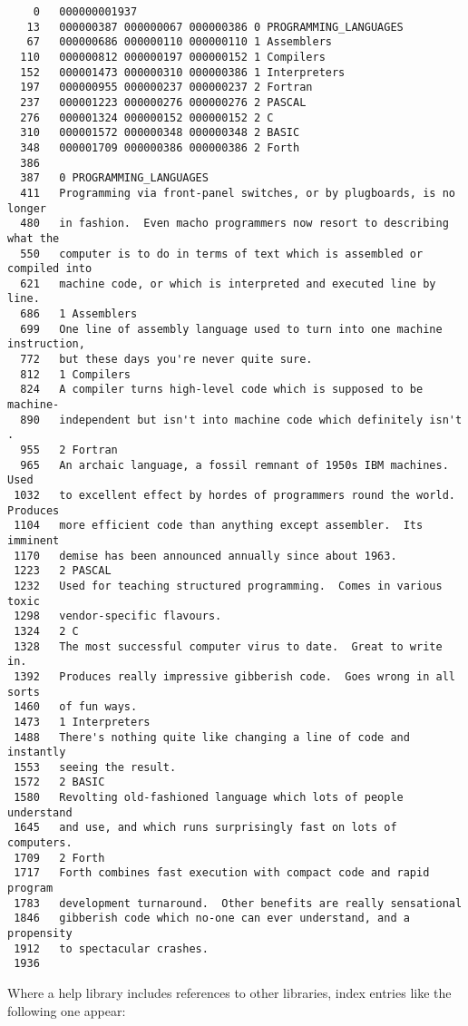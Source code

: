 \begin{small}
\begin{verbatim}
    0   000000001937
   13   000000387 000000067 000000386 0 PROGRAMMING_LANGUAGES
   67   000000686 000000110 000000110 1 Assemblers
  110   000000812 000000197 000000152 1 Compilers
  152   000001473 000000310 000000386 1 Interpreters
  197   000000955 000000237 000000237 2 Fortran
  237   000001223 000000276 000000276 2 PASCAL
  276   000001324 000000152 000000152 2 C
  310   000001572 000000348 000000348 2 BASIC
  348   000001709 000000386 000000386 2 Forth
  386   
  387   0 PROGRAMMING_LANGUAGES
  411   Programming via front-panel switches, or by plugboards, is no longer
  480   in fashion.  Even macho programmers now resort to describing what the
  550   computer is to do in terms of text which is assembled or compiled into
  621   machine code, or which is interpreted and executed line by line.
  686   1 Assemblers
  699   One line of assembly language used to turn into one machine instruction,
  772   but these days you're never quite sure.
  812   1 Compilers
  824   A compiler turns high-level code which is supposed to be machine-
  890   independent but isn't into machine code which definitely isn't .
  955   2 Fortran
  965   An archaic language, a fossil remnant of 1950s IBM machines.  Used
 1032   to excellent effect by hordes of programmers round the world.  Produces
 1104   more efficient code than anything except assembler.  Its imminent
 1170   demise has been announced annually since about 1963.
 1223   2 PASCAL
 1232   Used for teaching structured programming.  Comes in various toxic
 1298   vendor-specific flavours.
 1324   2 C
 1328   The most successful computer virus to date.  Great to write in.
 1392   Produces really impressive gibberish code.  Goes wrong in all sorts
 1460   of fun ways.
 1473   1 Interpreters
 1488   There's nothing quite like changing a line of code and instantly
 1553   seeing the result.
 1572   2 BASIC
 1580   Revolting old-fashioned language which lots of people understand
 1645   and use, and which runs surprisingly fast on lots of computers.
 1709   2 Forth
 1717   Forth combines fast execution with compact code and rapid program
 1783   development turnaround.  Other benefits are really sensational
 1846   gibberish code which no-one can ever understand, and a propensity
 1912   to spectacular crashes.
 1936    
\end{verbatim}
\end{small}

Where a help library includes references to other libraries, index
entries like the following one appear:

